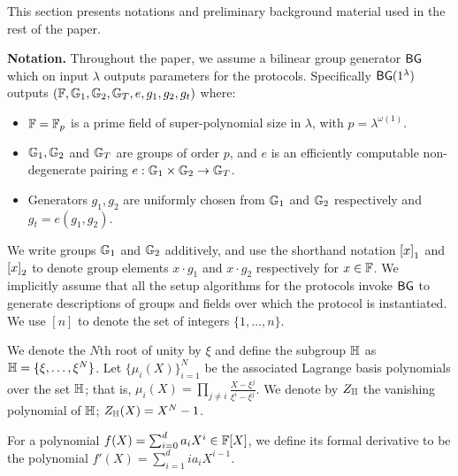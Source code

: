 This section presents notations and preliminary background material used in the rest of the paper.

\smallskip

\noindent\textbf{Notation.} Throughout the paper, we assume a bilinear group generator $\mathsf{BG}$ which on input $\lambda$ outputs
parameters for the protocols. Specifically $\mathsf{BG}(1^{\lambda})$ outputs $(\mathbb{F},\mathbb{G}_1,\mathbb{G}_2,\mathbb{G}_T, e, g_1, g_2,g_t)$
where:
\begin{itemize}[leftmargin=2em, label=-]
	\item $\mathbb{F}={\mathbb{F}_p}$ is a prime field of super-polynomial size in $\lambda$, with $p=\lambda^{\omega(1)}$.
	\item $\mathbb{G}_1,\mathbb{G}_2$ and $\mathbb{G}_T$ are groups of order $p$, and $e$ is an efficiently computable non-degenerate
	pairing $e:\mathbb{G}_1\times \mathbb{G}_2\rightarrow \mathbb{G}_T$.
	\item Generators $g_1,g_2$ are uniformly chosen from $\mathbb{G}_1$ and $\mathbb{G}_2$ respectively and $g_t=e(g_1,g_2)$.
\end{itemize}
We write groups $\mathbb{G}_1$ and $\mathbb{G}_2$ additively, and use the shorthand notation $\left[{x}\right]_1$ and $\left[{x}\right]_2$
to denote group elements $x\cdot g_1$ and $x\cdot g_2$ respectively for $x\in \mathbb{F}$. We implicitly assume
that all the setup algorithms for the protocols invoke $\mathsf{BG}$ to generate descriptions of groups and fields
over which the protocol is instantiated. We use $[n]$ to denote the set of integers $\{1,\ldots,n\}$.

\smallskip

We denote the $N$th root of unity by $\xi$ and define the subgroup $\mathbb{H}$ as $\mathbb{H} =\{\xi,\ldots,\xi^N\}$. 
Let $\{\mu_i(X)\}_{i=1}^N$ be the associated
Lagrange basis polynomials over the set $\mathbb{H}$; that is, $\mu_i(X) = \prod_{j\neq i} \frac{X-\xi^j}{\xi^{i}-\xi^j}$.
We denote by $Z_{\mathbb{H}}$ the vanishing polynomial of $\mathbb{H}$;  $Z_{\mathbb{H}}(X)=X^N-1$.

\smallskip

 For a polynomial $f(X) = \sum_{i=0}^{d}a_iX^i \in \mathbb{F}[X]$, we define its formal derivative  to be the polynomial $f'(X) = \sum_{i=1}^{d}ia_iX^{i-1}$.

